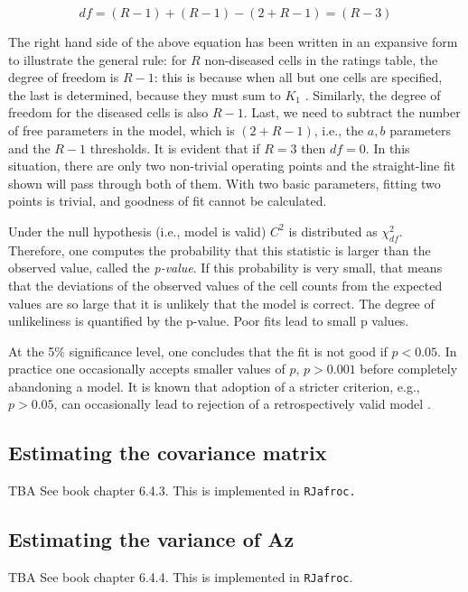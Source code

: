 \documentclass[
]{book}
\begin{document}
\begin{equation} 
df=\left ( R-1 \right )+\left ( R-1 \right )-\left (2+ R-1 \right )=\left ( R-3 \right )
\label{eq:binormal-modelGoodnessFitdf}
\end{equation}

The right hand side of the above equation has been written in an expansive form to illustrate the general rule: for \(R\) non-diseased cells in the ratings table, the degree of freedom is \(R-1\): this is because when all but one cells are specified, the last is determined, because they must sum to \(K_1\) . Similarly, the degree of freedom for the diseased cells is also \(R-1\). Last, we need to subtract the number of free parameters in the model, which is \((2+R-1)\), i.e., the \(a,b\) parameters and the \(R-1\) thresholds. It is evident that if \(R = 3\) then \(df = 0\). In this situation, there are only two non-trivial operating points and the straight-line fit shown will pass through both of them. With two basic parameters, fitting two points is trivial, and goodness of fit cannot be calculated.

Under the null hypothesis (i.e., model is valid) \(C^2\) is distributed as \(\chi_{df}^{2}\). Therefore, one computes the probability that this statistic is larger than the observed value, called the \emph{p-value}. If this probability is very small, that means that the deviations of the observed values of the cell counts from the expected values are so large that it is unlikely that the model is correct. The degree of unlikeliness is quantified by the p-value. Poor fits lead to small p values.

At the 5\% significance level, one concludes that the fit is not good if \(p < 0.05\). In practice one occasionally accepts smaller values of \(p\), \(p > 0.001\) before completely abandoning a model. It is known that adoption of a stricter criterion, e.g., \(p > 0.05\), can occasionally lead to rejection of a retrospectively valid model \citep{RN300}.

\hypertarget{estimating-the-covariance-matrix}{%
\subsection{Estimating the covariance matrix}\label{estimating-the-covariance-matrix}}

TBA See book chapter 6.4.3. This is implemented in \texttt{RJafroc.}

\hypertarget{estimating-the-variance-of-az}{%
\subsection{Estimating the variance of Az}\label{estimating-the-variance-of-az}}

TBA See book chapter 6.4.4. This is implemented in \texttt{RJafroc}.

  
\end{document}
